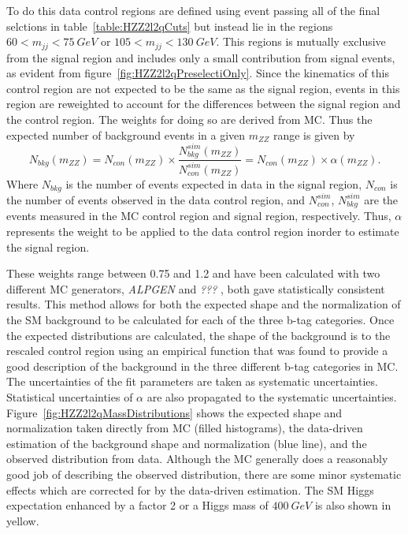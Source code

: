 To do this data control regions are defined using event passing all
of the final selctions in table~\ref{table:HZZ2l2qCuts} but instead
lie in the regions $60 < m_{jj} < 75~GeV$ or $105 < m_{jj} < 130~GeV$. 
This regions is mutually exclusive from the signal region and includes
only a small contribution from signal events, as evident from 
figure~\ref{fig:HZZ2l2qPreselectiOnly}.  Since the kinematics of
this control region are not expected to be the same as the signal 
region, events in this region are reweighted to account for the 
differences between the signal region and the control region.  The
weights for doing so are derived from MC.  Thus the expected number
of background events in a given $m_{ZZ}$ range is given by
\begin{equation}
N_{bkg}(m_{ZZ}) = N_{con}(m_{ZZ})\times\frac{N_{bkg}^{sim}(m_{ZZ})}{N_{con}^{sim}(m_{ZZ})}=N_{con}(m_{ZZ})\times\alpha(m_{ZZ}).
\label{eq:HZZ2l2qAlpha}
\end{equation}
Where $N_{bkg}$ is the number of events expected in data in the 
signal region, $N_{con}$ is the number of events observed in the
data control region, and $N_{con}^{sim}$, $N_{bkg}^{sim}$ are the 
events measured in the MC control region and signal region, 
respectively.  Thus, $\alpha$ represents the weight to be applied
to the data control region inorder to estimate the signal region. 


These weights range between 0.75 and 1.2 and have been calculated
with two different MC generators, {\it ALPGEN} and {\it ??? }, 
both gave statistically consistent results.  This method allows
for both the expected shape and the normalization of the SM
background to be calculated for each of the three b-tag categories.
Once the expected distributions are calculated, the shape of the
background is to the rescaled control region using an empirical
function that was found to provide a good description of the 
background in the three different b-tag categories in MC.  
The uncertainties of the fit parameters are taken as systematic
uncertainties.  Statistical uncertainties of $\alpha$ are also 
propagated to the systematic uncertainties.  
Figure~\ref{fig:HZZ2l2qMassDistributions} shows the expected 
shape and normalization taken directly from MC (filled histograms), 
the data-driven estimation of the background shape and normalization
(blue line), and the observed distribution from data. Although
the MC generally does a reasonably good job of describing the 
observed distribution, there are some minor systematic effects which 
are corrected for by the data-driven estimation.  The SM Higgs
expectation enhanced by a factor 2 or a Higgs mass of $400~GeV$ 
is also shown in yellow.  

